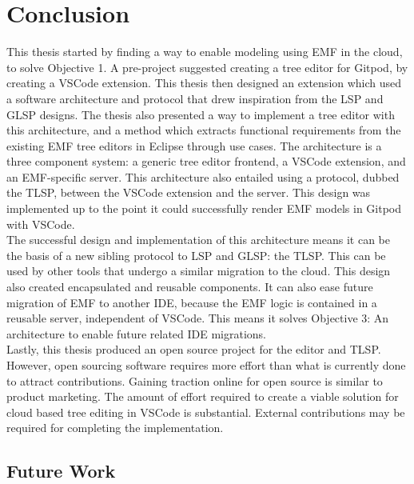 \chapter{Conclusion}\label{chap:conclusion}

This thesis started by finding a way to enable modeling using \acrlong{EMF} in the \gls{cloud}, to solve Objective 1.
A pre-project suggested creating a tree editor for \gls{Gitpod}, by creating a \gls{VSCode} extension.
This thesis then designed an extension which used a software architecture and protocol that drew inspiration from the \acrlong{LSP} and \acrlong{GLSP} designs.
The thesis also presented a way to implement a tree editor with this architecture, and a method which extracts functional requirements from the existing \acrshort{EMF} tree editors in \gls{Eclipse} through use cases.
The architecture is a three component system: a generic tree editor frontend, a \gls{VSCode} extension, and an \acrshort{EMF}-specific server.
This architecture also entailed using a protocol, dubbed the \acrfull{TLSP}, between the \gls{VSCode} extension and the server.
This design was implemented up to the point it could successfully render \acrshort{EMF} models in \gls{Gitpod} with \gls{VSCode}.\\

The successful design and implementation of this architecture means it can be the basis of a new sibling protocol to \acrshort{LSP} and \acrshort{GLSP}: the \acrshort{TLSP}.
This can be used by other tools that undergo a similar migration to the \gls{cloud}. 
This design also created encapsulated and reusable components.
It can also ease future migration of \acrshort{EMF} to another \acrlong{IDE}, because the \acrshort{EMF} logic is contained in a reusable server, independent of \gls{VSCode}.
This means it solves Objective 3: An architecture to enable future related IDE migrations.\\

Lastly, this thesis produced an \gls{open source} project for the editor and \acrshort{TLSP}.
However, open sourcing software requires more effort than what is currently done to attract contributions.
Gaining traction online for \gls{open source} is similar to product marketing.
The amount of effort required to create a viable solution for \gls{cloud} based tree editing in \gls{VSCode} is substantial.
External contributions may be required for completing the implementation.



\section{Future Work}

